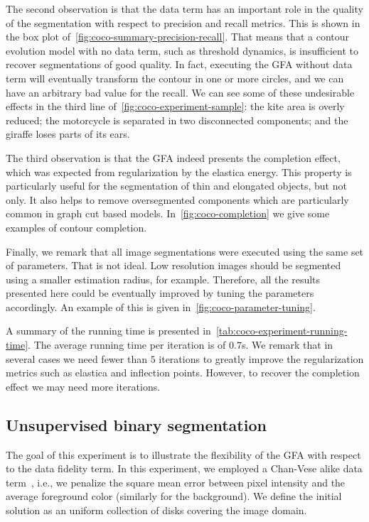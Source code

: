 \documentclass[review]{siamart220329}
\begin{document}
The second observation is that the data term has an important role in the
quality of the segmentation with respect to precision and recall metrics. This
is shown in the box plot of~\cref{fig:coco-summary-precision-recall}. That means
that a contour evolution model with no data term, such as threshold dynamics, is
insufficient to recover segmentations of good quality. In fact, executing the
GFA without data term will eventually transform the contour in one or more
circles, and we can have an arbitrary bad value for the recall. We can see some
of these undesirable effects in the third line
of~\cref{fig:coco-experiment-sample}: the kite area is overly reduced; the
motorcycle is separated in two disconnected components; and the giraffe loses
parts of its ears.

The third observation is that the GFA indeed presents the completion effect,
which was expected from regularization by the elastica energy. This property is
particularly useful for the segmentation of thin and elongated objects, but not
only. It also helps to remove oversegmented components which are particularly
common in graph cut based models. In~\cref{fig:coco-completion} we give some
examples of contour completion.

Finally, we remark that all image segmentations were executed using the same set
of parameters. That is not ideal. Low resolution images should be segmented
using a smaller estimation radius, for example. Therefore, all the results
presented here could be eventually improved by tuning the parameters
accordingly. An example of this is given in~\cref{fig:coco-parameter-tuning}.

A summary of the running time is presented
in~\cref{tab:coco-experiment-running-time}. The average running time per
iteration is of $0.7$s. We remark that in several cases we need fewer than $5$
iterations to greatly improve the regularization metrics such as elastica and
inflection points. However, to recover the completion effect we may need more
iterations.
%
%
\subsection{Unsupervised binary segmentation}
The goal of this experiment is to illustrate the flexibility of the GFA with
respect to the data fidelity term. In this experiment, we employed a Chan-Vese
alike data term~\cite{chan01}, i.e., we penalize the square mean error between
pixel intensity and the average foreground color (similarly for the background).
We define the initial solution as an uniform collection of disks covering the
image domain.
\end{document}
